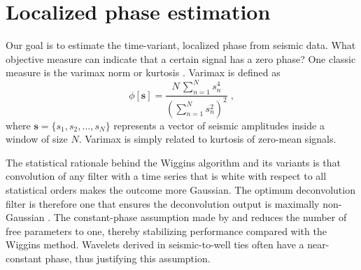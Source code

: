 \section{Localized phase estimation}




Our goal is to estimate the time-variant, localized phase from seismic
data. What objective measure can indicate that a certain signal has a
zero phase? One classic measure is the varimax norm or kurtosis
\cite[]{Wiggins78,GEO52-01-00510059,Whit88}. Varimax is defined as
\begin{equation}
  \label{eq:focus} \phi[\mathbf{s}] = \frac{\displaystyle N\,\sum_{n=1}^N
  s_n^4}{\displaystyle \left(\sum_{n=1}^{N} s_n^2\right)^2}\;,
\end{equation}
where $\mathbf{s}=\{s_1,s_2,\ldots,s_N\}$ represents a vector of seismic amplitudes 
inside a window of size $N$. Varimax is simply related to kurtosis of
zero-mean signals.

The statistical rationale behind the Wiggins algorithm and its
variants is that convolution of any filter with a time series that is
white with respect to all statistical orders makes the outcome more
Gaussian.  The optimum deconvolution filter is therefore one that
ensures the deconvolution output is maximally
non-Gaussian \cite[]{Dono81}. The constant-phase assumption made
by \cite{GEO52-01-00510059} and \cite{Whit88} reduces the number of
free parameters to one, thereby stabilizing performance compared with
the Wiggins method. Wavelets derived in seismic-to-well ties often
have a near-constant phase, thus justifying this assumption.

